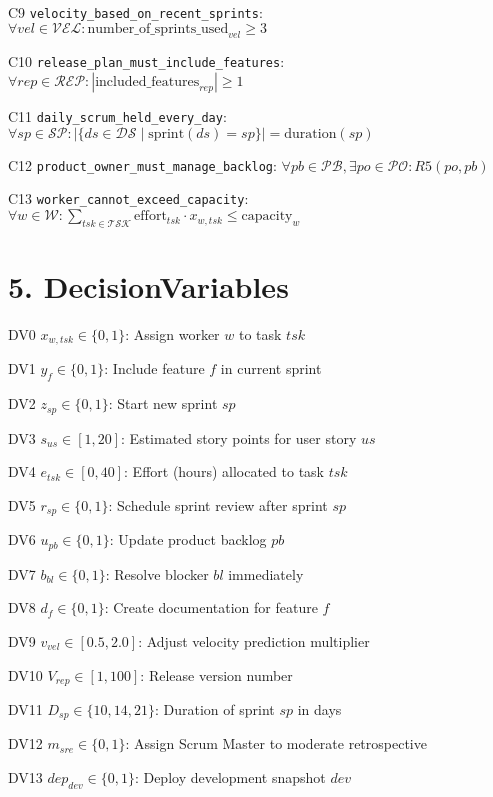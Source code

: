 \documentclass[12pt]{article}
\begin{document}
    \item[C9] \texttt{velocity\_based\_on\_recent\_sprints}: 
      $ \forall vel \in \mathcal{VEL}: \text{number\_of\_sprints\_used}_{vel} \geq 3 $

    \item[C10] \texttt{release\_plan\_must\_include\_features}: 
      $ \forall rep \in \mathcal{REP}: |\text{included\_features}_{rep}| \geq 1 $

    \item[C11] \texttt{daily\_scrum\_held\_every\_day}: 
      $ \forall sp \in \mathcal{SP}: |\{ ds \in \mathcal{DS} \mid \text{sprint}(ds) = sp \}| = \text{duration}(sp) $

    \item[C12] \texttt{product\_owner\_must\_manage\_backlog}: 
      $ \forall pb \in \mathcal{PB}, \exists po \in \mathcal{PO}: R5(po, pb) $

    \item[C13] \texttt{worker\_cannot\_exceed\_capacity}: 
      $ \forall w \in \mathcal{W}: \sum_{tsk \in \mathcal{TSK}} \text{effort}_{tsk} \cdot x_{w,tsk} \leq \text{capacity}_w $

\section{5. DecisionVariables}
\item[DV0] $ x_{w,tsk} \in \{0,1\} $: Assign worker $ w $ to task $ tsk $
    \item[DV1] $ y_f \in \{0,1\} $: Include feature $ f $ in current sprint
    \item[DV2] $ z_{sp} \in \{0,1\} $: Start new sprint $ sp $
    \item[DV3] $ s_{us} \in [1,20] $: Estimated story points for user story $ us $
    \item[DV4] $ e_{tsk} \in [0,40] $: Effort (hours) allocated to task $ tsk $
    \item[DV5] $ r_{sp} \in \{0,1\} $: Schedule sprint review after sprint $ sp $
    \item[DV6] $ u_{pb} \in \{0,1\} $: Update product backlog $ pb $
    \item[DV7] $ b_{bl} \in \{0,1\} $: Resolve blocker $ bl $ immediately
    \item[DV8] $ d_f \in \{0,1\} $: Create documentation for feature $ f $
    \item[DV9] $ v_{vel} \in [0.5,2.0] $: Adjust velocity prediction multiplier
    \item[DV10] $ V_{rep} \in [1,100] $: Release version number
    \item[DV11] $ D_{sp} \in \{10,14,21\} $: Duration of sprint $ sp $ in days
    \item[DV12] $ m_{sre} \in \{0,1\} $: Assign Scrum Master to moderate retrospective
    \item[DV13] $ dep_{dev} \in \{0,1\} $: Deploy development snapshot $ dev $
\end{document}
